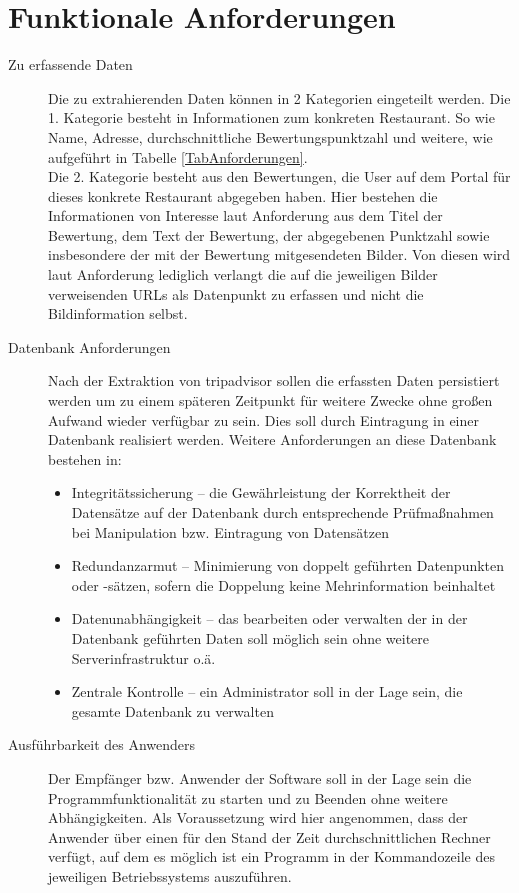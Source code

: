 \documentclass[a4paper,oneside,12pt]{report}
\begin{document}
		\section[Funktionale Anforderungen - Skanny Morandi]{Funktionale Anforderungen}

		\begin{description}
		\item[Zu erfassende Daten] Die zu extrahierenden Daten können in 2 Kategorien eingeteilt werden. Die 1. Kategorie besteht in Informationen zum konkreten Restaurant. So wie Name, Adresse, durchschnittliche Bewertungspunktzahl und weitere, wie aufgeführt in Tabelle \ref{TabAnforderungen}.  \\ 
        Die 2. Kategorie besteht aus den Bewertungen, die User auf dem Portal für dieses konkrete Restaurant abgegeben haben. Hier bestehen die Informationen von Interesse laut Anforderung aus dem Titel der Bewertung, dem Text der Bewertung, der abgegebenen Punktzahl sowie insbesondere der mit der Bewertung mitgesendeten Bilder. Von diesen wird laut Anforderung lediglich verlangt die auf die jeweiligen Bilder verweisenden URLs als Datenpunkt zu erfassen und nicht die Bildinformation selbst.

	
        \item[Datenbank Anforderungen]
        Nach der Extraktion von tripadvisor sollen die erfassten Daten persistiert werden um zu einem späteren Zeitpunkt für weitere Zwecke ohne großen Aufwand wieder verfügbar zu sein. Dies soll durch Eintragung in einer Datenbank realisiert werden. Weitere Anforderungen an diese Datenbank bestehen in: 
        \begin{itemize}
        \item Integritätssicherung – die Gewährleistung der Korrektheit der Datensätze auf der Datenbank durch entsprechende Prüfmaßnahmen bei Manipulation bzw. Eintragung von Datensätzen	   
        \item Redundanzarmut – Minimierung von doppelt geführten Datenpunkten oder -sätzen, sofern die Doppelung keine Mehrinformation beinhaltet 
        \item Datenunabhängigkeit – das bearbeiten oder verwalten der in der Datenbank geführten Daten soll möglich sein ohne weitere Serverinfrastruktur o.ä.\\
        \item Zentrale Kontrolle – ein Administrator soll in der Lage sein, die gesamte Datenbank zu verwalten
      
        \end{itemize}
        \item[Ausführbarkeit des Anwenders] Der Empfänger bzw. Anwender der Software soll in der Lage sein die Programmfunktionalität zu starten und zu Beenden ohne weitere Abhängigkeiten. Als Voraussetzung wird hier angenommen, dass der Anwender über einen für den Stand der Zeit durchschnittlichen Rechner verfügt, auf dem es möglich ist ein Programm in der Kommandozeile des jeweiligen Betriebssystems auszuführen.
       

\end{description}
\end{document}
